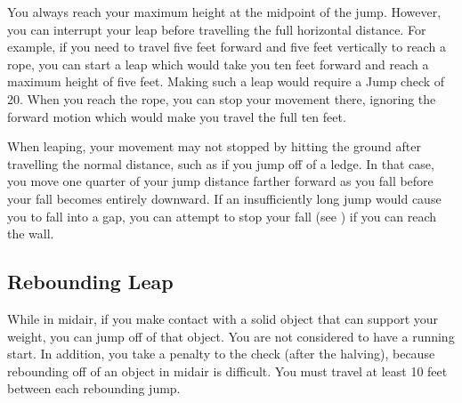         You always reach your maximum height at the midpoint of the jump.
        However, you can interrupt your leap before travelling the full horizontal distance.
        For example, if you need to travel five feet forward and five feet vertically to reach a rope, you can start a leap which would take you ten feet forward and reach a maximum height of five feet.
        Making such a leap would require a Jump check of 20.
        When you reach the rope, you can stop your movement there, ignoring the forward motion which would make you travel the full ten feet.

        When leaping, your movement may not stopped by hitting the ground after travelling the normal distance, such as if you jump off of a ledge.
        In that case, you move one quarter of your jump distance farther forward as you fall before your fall becomes entirely downward.
        If an insufficiently long jump would cause you to fall into a gap, you can attempt to stop your fall (see ) if you can reach the wall.

    \subsection{Rebounding Leap}\label{Rebounding Leap}
        While in midair, if you make contact with a solid object that can support your weight, you can jump off of that object.
        You are not considered to have a running start.
        In addition, you take a  penalty to the check (after the halving), because rebounding off of an object in midair is difficult.
        You must travel at least 10 feet between each rebounding jump.

